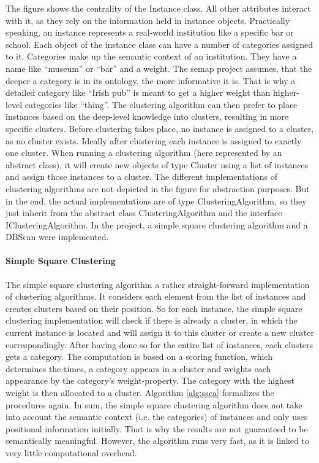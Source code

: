 The figure shows the centrality of the Instance class. All other attributes interact with it, as they rely on the information held in instance objects. Practically speaking, an instance represents a real-world institution like a specific bar or school. Each object of the instance class can have a number of categories assigned to it. Categories make up the semantic context of an institution. They have a name like “museum” or “bar” and a weight. The semap project assumes, that the deeper a category is in its ontology, the more informative it is. That is why a detailed category like “Irish pub” is meant to get a higher weight than higher-level categories like “thing”. The clustering algorithm can then prefer to place instances based on the deep-level knowledge into clusters, resulting in more specific clusters.
Before clustering takes place, no instance is assigned to a cluster, as no cluster exists. Ideally after clustering each instance is assigned to exactly one cluster. When running a clustering algorithm (here represented by an abstract class), it will create new objects of type Cluster using a list of instances and assign those instances to a cluster. The different implementations of clustering algorithms are not depicted in the figure for abstraction purposes. But in the end, the actual implementations are of type ClusteringAlgorithm, so they just inherit from the abstract class ClusteringAlgorithm and the interface IClusteringAlgorithm. In the project, a simple square clustering algorithm and a DBScan were implemented.


\paragraph{Simple Square Clustering }
The simple square clustering algorithm a rather straight-forward implementation of clustering algorithms. It considers each element from the list of instances and creates clusters based on their position. So for each instance, the simple square clustering implementation will check if there is already a cluster, in which the current instance is located and will assign it to this cluster or create a new cluster correspondingly. After having done so for the entire list of instances, each clusters gets a category. The computation is based on a scoring function, which determines the times, a category appears in a cluster and weights each appearance by the category’s weight-property. The category with the highest weight is then allocated to a cluster. Algorithm \ref{alg:ssca} formalizes the procedures again. In sum, the simple square clustering algorithm does not take into account the semantic context (i.e. the categories) of instances and only uses positional information initially. That is why the results are not guaranteed to be semantically meaningful. However, the algorithm runs very fast, as it is linked to very little computational overhead.


